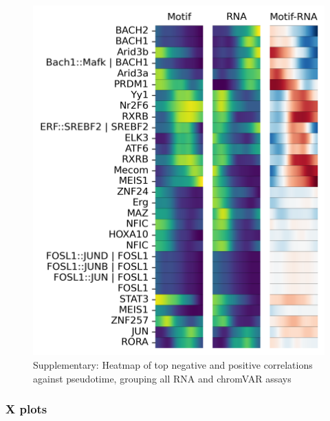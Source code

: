 \documentclass[a4paper]{article}
\begin{document}
\begin{figure}[!htb]
  \centering
  \includegraphics[width=\textwidth]{../figures/hematopoiesis/Basophil_40_109_single_smooth_none_heatmap_grouped_assays.png}
  \caption{Supplementary: Heatmap of top negative and positive correlations against pseudotime, grouping all RNA and chromVAR assays}
\end{figure}

\FloatBarrier
\subsubsection{X plots}
 
\end{document}
